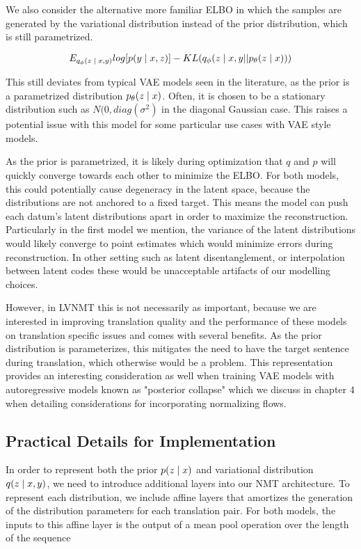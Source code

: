 We also consider the alternative more familiar ELBO in which the samples are generated by the variational distribution instead of the prior distribution, which is still parametrized. 

\begin{equation}
E_{q_{\phi}(z \; | \;{x, y})}  log[p(y \; | \;{x, z} ) ] - KL (q_{\phi}(z \; | \;{x, y} || p_{\theta}(z \; | \;{x})))
\end{equation}

This still deviates from typical \ac{VAE} models seen in the literature, as the prior is a parametrized distribution $p_{\theta}(z \; | \;{x})$. Often, it is chosen to be a stationary distribution such as $N(0, diag(\sigma^{2})$ in the diagonal Gaussian case. This raises a potential issue with this model for some particular use cases with \ac{VAE} style models. 

As the prior is parametrized, it is likely during optimization that $q$ and $p$ will quickly converge towards each other to minimize the \ac{ELBO}. For both models, this could potentially cause degeneracy in the latent space, because the distributions are not anchored to a fixed target. This means the model can push each datum's latent distributions apart in order to maximize the reconstruction. Particularly in the first model we mention, the variance of the latent distributions would likely converge to point estimates which would minimize errors during reconstruction. In other setting such as latent disentanglement, or interpolation between latent codes these would be unacceptable artifacts of our modelling choices. 

However, in \ac{LVNMT} this is not necessarily as important, because we are interested in improving translation quality and the performance of these models on translation specific issues and comes with several benefits. As the prior distribution is parameterizes, this mitigates the need to have the target sentence during translation, which otherwise would be a problem.  This representation provides an interesting consideration as well when training \ac{VAE} models with autoregressive models known as "posterior collapse" which we discuss in chapter 4 when detailing considerations for incorporating normalizing flows. 

\subsection{Practical Details for Implementation}

In order to represent both the prior $p(z \; | \;{x})$ and variational distribution $q(z \; | \;{x, y})$, we need to introduce additional layers into our \ac{NMT} architecture. To represent each distribution, we include affine layers that amortizes the generation of the distribution parameters for each translation pair. For both models, the inputs to this affine layer is the output of a mean pool operation over the length of the sequence

